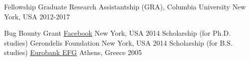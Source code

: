 

\begin{cvhonors}

  \cvhonor
    {Fellowship} %
		{Graduate Research Assistantship (GRA), Columbia University}
    {New York, USA}
    {2012-2017}

  \cvhonor
    {Bug Bounty Grant}
{\href{https://www.facebook.com/whitehat/thanks}{Facebook}} %
    {New York, USA} %
    {2014} %
  \cvhonor
{Scholarship (for Ph.D. studies)} %
    {Gerondelis Foundation}
    {New York, USA} %
    {2014} %
  \cvhonor
{Scholarship (for B.S. studies)} %
		{\href{https://www.eurobank.gr/}{Eurobank EFG}}
    {Athens, Greece}
    {2005}
\end{cvhonors}
\pagebreak

